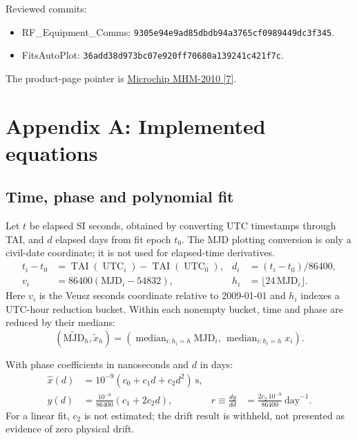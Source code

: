 \documentclass[11pt,a4paper]{article}
\begin{document}
Reviewed commits:
\begin{itemize}
\item RF\_Equipment\_Comms: \texttt{9305e94e9ad85dbdb94a3765cf0989449dc3f345}.
\item FitsAutoPlot: \texttt{36add38d973bc07e920ff70680a139241c421f7c}.
\end{itemize}
The product-page pointer is
\href{https://www.microchip.com/en-us/product/mhm-2010}{Microchip MHM-2010 [7]}.
\clearpage

\section{Appendix A: Implemented equations}
\subsection{Time, phase and polynomial fit}
Let \(t\) be elapsed SI seconds, obtained by converting UTC timestamps through
TAI, and \(d\) elapsed days from fit epoch \(t_0\). The MJD plotting conversion
is only a civil-date coordinate; it is not used for elapsed-time derivatives.
\begin{align}
t_i-t_0&=\operatorname{TAI}(\operatorname{UTC}_i)-
          \operatorname{TAI}(\operatorname{UTC}_0),&
d_i&=(t_i-t_0)/86400, \tag{A1}\\
v_i&=86400(\mathrm{MJD}_i-54832),&
h_i&=\lfloor24\,\mathrm{MJD}_i\rfloor. \tag{A2}
\end{align}
Here \(v_i\) is the Veusz seconds coordinate relative to 2009-01-01 and \(h_i\)
indexes a UTC-hour reduction bucket. Within each nonempty bucket, time and
phase are reduced by their medians:
\begin{equation}
(\widetilde{\mathrm{MJD}}_h,\widetilde{x}_h)
=\left(\operatorname{median}_{i:h_i=h}\mathrm{MJD}_i,\,
       \operatorname{median}_{i:h_i=h}x_i\right). \tag{A3}
\end{equation}

With phase coefficients in nanoseconds and \(d\) in days:
\begin{align}
\widehat{x}(d)&=10^{-9}(c_0+c_1d+c_2d^2)\ \mathrm{s}, \tag{A4}\\
y(d)&=\frac{10^{-9}}{86400}(c_1+2c_2d),&
r\equiv\frac{dy}{dd}&=\frac{2c_2\,10^{-9}}{86400}\ \mathrm{day}^{-1}. \tag{A5}
\end{align}
For a linear fit, \(c_2\) is not estimated; the drift result is withheld, not
presented as evidence of zero physical drift.
\end{document}
